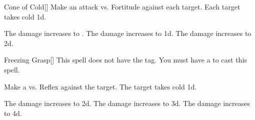 \lowercase{\hypertarget{spell:Cone of Cold}{}}\label{spell:Cone of Cold}
\begin{freeability}[Rank 1]{\hypertarget{spell:Cone of Cold}{Cone of Cold}}[]
Make an attack vs. Fortitude against each target.
\hit Each target takes cold  \minus1d.

\rankline
{} The damage increases to .
 The damage increases to  \plus1d.
 The damage increases to  \plus2d.
\end{freeability}
\vspace{0.25em}



\lowercase{\hypertarget{spell:Freezing Grasp}{}}\label{spell:Freezing Grasp}
\begin{freeability}[Rank 1]{\hypertarget{spell:Freezing Grasp}{Freezing Grasp}}[]
This spell does not have the  tag.
You must have a  to cast this spell.

Make a  vs. Reflex against the target.
\hit The target takes cold  \plus1d.

\rankline
{} The damage increases to  \plus2d.
 The damage increases to  \plus3d.
 The damage increases to  \plus4d.
\end{freeability}
\vspace{0.25em}



